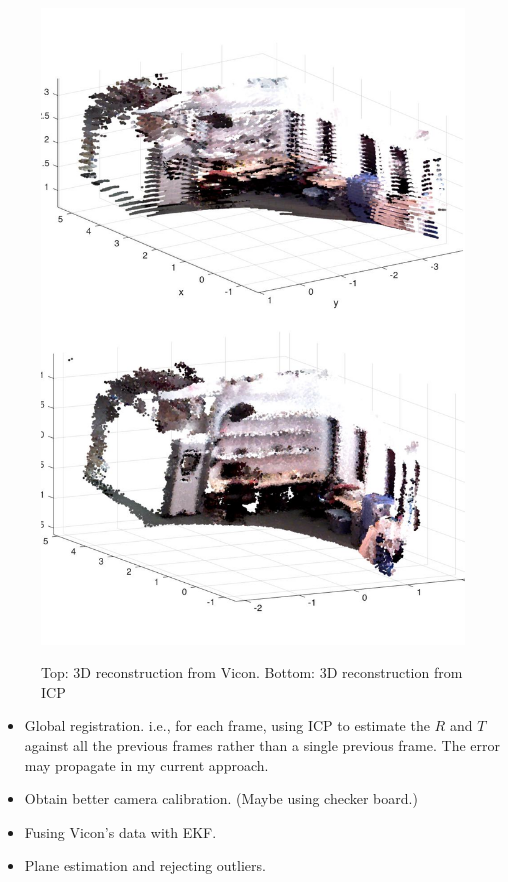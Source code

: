 \documentclass[letterpaper, 10 pt, conference]{ieeeconf}  %
\begin{document}
\begin{figure}
\centering
\includegraphics[width=\columnwidth]{viconicp.jpg}\\
\caption{Top: 3D reconstruction from Vicon. Bottom: 3D reconstruction from ICP}
\label{fig:viconicp}
\end{figure}



\begin{itemize}
\item Global registration. i.e., for each frame, using ICP to estimate the $R$ and $T$ against all the previous frames rather than a single previous frame. The error may propagate in my current approach.
\item Obtain better camera calibration. (Maybe using checker board.)
\item Fusing Vicon's data with EKF. 
\item Plane estimation and rejecting outliers. 
\end{itemize}
\end{document}
